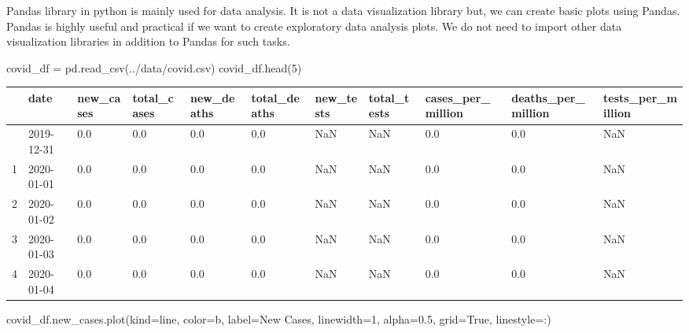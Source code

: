 \documentclass[
  letterpaper,
  DIV=11,
  numbers=noendperiod]{scrreprt}
\newenvironment{Shaded}{\begin{snugshade}}{\end{snugshade}}
\newcommand{\DecValTok}[1]{\textcolor[rgb]{0.68,0.00,0.00}{#1}}
\newcommand{\FloatTok}[1]{\textcolor[rgb]{0.68,0.00,0.00}{#1}}
\newcommand{\NormalTok}[1]{\textcolor[rgb]{0.00,0.23,0.31}{#1}}
\newcommand{\OperatorTok}[1]{\textcolor[rgb]{0.37,0.37,0.37}{#1}}
\newcommand{\StringTok}[1]{\textcolor[rgb]{0.13,0.47,0.30}{#1}}
\newcommand{\VariableTok}[1]{\textcolor[rgb]{0.07,0.07,0.07}{#1}}
\begin{document}
Pandas library in python is mainly used for data analysis. It is not a
data visualization library but, we can create basic plots using Pandas.
Pandas is highly useful and practical if we want to create exploratory
data analysis plots. We do not need to import other data visualization
libraries in addition to Pandas for such tasks.

\begin{Shaded}
\begin{Highlighting}[]
\NormalTok{covid\_df }\OperatorTok{=}\NormalTok{ pd.read\_csv(}\StringTok{\textquotesingle{}../data/covid.csv\textquotesingle{}}\NormalTok{)}
\NormalTok{covid\_df.head(}\DecValTok{5}\NormalTok{)}
\end{Highlighting}
\end{Shaded}

\begin{longtable}[]{@{}lllllllllll@{}}
\toprule\noalign{}
& date & new\_cases & total\_cases & new\_deaths & total\_deaths &
new\_tests & total\_tests & cases\_per\_million & deaths\_per\_million &
tests\_per\_million \\
\midrule\noalign{}
\endhead
\bottomrule\noalign{}
\endlastfoot
0 & 2019-12-31 & 0.0 & 0.0 & 0.0 & 0.0 & NaN & NaN & 0.0 & 0.0 & NaN \\
1 & 2020-01-01 & 0.0 & 0.0 & 0.0 & 0.0 & NaN & NaN & 0.0 & 0.0 & NaN \\
2 & 2020-01-02 & 0.0 & 0.0 & 0.0 & 0.0 & NaN & NaN & 0.0 & 0.0 & NaN \\
3 & 2020-01-03 & 0.0 & 0.0 & 0.0 & 0.0 & NaN & NaN & 0.0 & 0.0 & NaN \\
4 & 2020-01-04 & 0.0 & 0.0 & 0.0 & 0.0 & NaN & NaN & 0.0 & 0.0 & NaN \\
\end{longtable}

\begin{Shaded}
\begin{Highlighting}[]
\NormalTok{covid\_df.new\_cases.plot(kind}\OperatorTok{=}\StringTok{\textquotesingle{}line\textquotesingle{}}\NormalTok{, color}\OperatorTok{=}\StringTok{\textquotesingle{}b\textquotesingle{}}\NormalTok{, label}\OperatorTok{=}\StringTok{\textquotesingle{}New Cases\textquotesingle{}}\NormalTok{, linewidth}\OperatorTok{=}\DecValTok{1}\NormalTok{, alpha}\OperatorTok{=}\FloatTok{0.5}\NormalTok{, grid}\OperatorTok{=}\VariableTok{True}\NormalTok{, linestyle}\OperatorTok{=}\StringTok{\textquotesingle{}:\textquotesingle{}}\NormalTok{)}
\end{Highlighting}
\end{Shaded}
\end{document}
